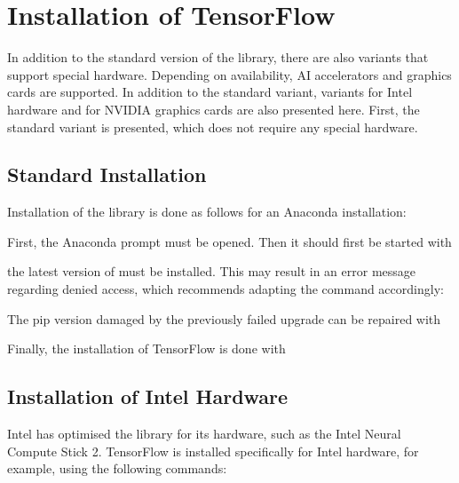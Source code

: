 \section{Installation of TensorFlow}

In addition to the standard version of the library, there are also variants that support special hardware. Depending on availability, AI accelerators and graphics cards are supported. In addition to the standard variant, variants for Intel hardware and for NVIDIA graphics cards are also presented here. First, the standard variant is presented, which does not require any special hardware.



\subsection{Standard Installation}



Installation of the library is done as follows for an Anaconda installation:

First, the Anaconda prompt must be opened. Then it should first be started with

\medskip 
{}
\medskip

the latest version of  must be installed. This may result in an error message regarding denied access, which recommends adapting the command accordingly:

\medskip
{}
\medskip

The pip version damaged by the previously failed upgrade can be repaired with

\medskip
{}
\medskip

Finally, the installation of TensorFlow is done with

\medskip



\subsection{Installation of Intel Hardware} %

Intel has optimised the library for its hardware, such as the Intel Neural Compute Stick 2. TensorFlow is installed specifically for Intel hardware, for example, using the following commands:

\medskip




